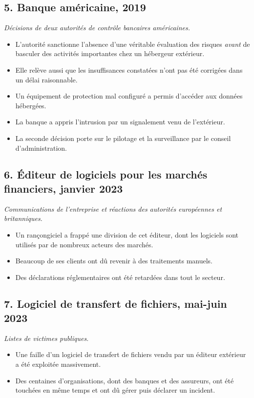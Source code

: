 \documentclass[11pt,a4paper]{article}
\begin{document}
\subsection*{5. Banque américaine, 2019}
\textit{Décisions de deux autorités de contrôle bancaires américaines.}
\begin{itemize}[itemsep=2pt]
\item L'autorité sanctionne l'absence d'une véritable évaluation des risques \emph{avant} de
      basculer des activités importantes chez un hébergeur extérieur.
\item Elle relève aussi que les insuffisances constatées n'ont pas été corrigées dans un délai
      raisonnable.
\item Un équipement de protection mal configuré a permis d'accéder aux données hébergées.
\item La banque a appris l'intrusion par un signalement venu de l'extérieur.
\item La seconde décision porte sur le pilotage et la surveillance par le conseil
      d'administration.
\end{itemize}

\subsection*{6. Éditeur de logiciels pour les marchés financiers, janvier 2023}
\textit{Communications de l'entreprise et réactions des autorités européennes et britanniques.}
\begin{itemize}[itemsep=2pt]
\item Un rançongiciel a frappé une division de cet éditeur, dont les logiciels sont utilisés par
      de nombreux acteurs des marchés.
\item Beaucoup de ses clients ont dû revenir à des traitements manuels.
\item Des déclarations réglementaires ont été retardées dans tout le secteur.
\end{itemize}

\subsection*{7. Logiciel de transfert de fichiers, mai-juin 2023}
\textit{Listes de victimes publiques.}
\begin{itemize}[itemsep=2pt]
\item Une faille d'un logiciel de transfert de fichiers vendu par un éditeur extérieur a été
      exploitée massivement.
\item Des centaines d'organisations, dont des banques et des assureurs, ont été touchées en même
      temps et ont dû gérer puis déclarer un incident.
\end{itemize}
\end{document}
